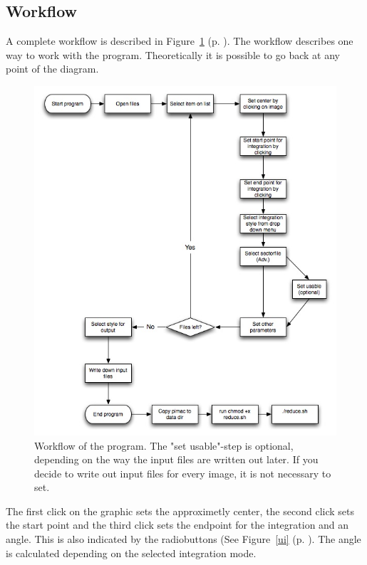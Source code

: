 \subsection{Workflow}
A complete workflow is described in Figure~\ref{workflow} (p. \pageref{workflow}). The workflow describes one way to work with the program. Theoretically it is possible to go back at any point of the diagram. 

\begin{figure}
\includegraphics[width=12cm]{diagram}
\caption{Workflow of the program. The "set usable"-step is optional, depending on the way the input files are written out later. If you decide to write out input files for every image, it is not necessary to set.  }
\label{workflow} 
\end{figure} 
The first click on the graphic sets the approximetly center, the second click sets the start point and the third click sets the endpoint for the integration and an angle. This is also indicated by the radiobuttons (See Figure~\ref{ui} (p. \pageref{ui}). The angle is calculated depending on the selected integration mode.

